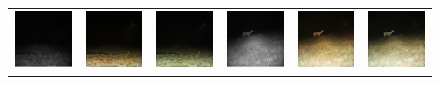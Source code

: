 \begin{figure}[htp!]
\begin{tabularx}{\textwidth}{>{\centering\arraybackslash}X >{\centering\arraybackslash}X >{\centering\arraybackslash}X >{\centering\arraybackslash}X >{\centering\arraybackslash}X >{\centering\arraybackslash}X}
        \includegraphics{gfx/conditional-with-cycle-gan-qual/nir_S2_B06_R3_PICT3848.jpg} & \includegraphics{gfx/conditional-with-cycle-gan-qual/cyclegan_S2_B06_R3_PICT3848_fake.png} & \includegraphics{gfx/conditional-with-cycle-gan-qual/diff_cycle_gan_S2_B06_R3_PICT3848_fake.png} & \includegraphics{gfx/conditional-with-cycle-gan-qual/nir_S2_B07_R1_PICT3274.jpg} & \includegraphics{gfx/conditional-with-cycle-gan-qual/cyclegan_S2_B07_R1_PICT3274_fake.png} & \includegraphics{gfx/conditional-with-cycle-gan-qual/diff_cycle_gan_S2_B07_R1_PICT3274_fake.png}

\end{tabularx}
\end{figure}
